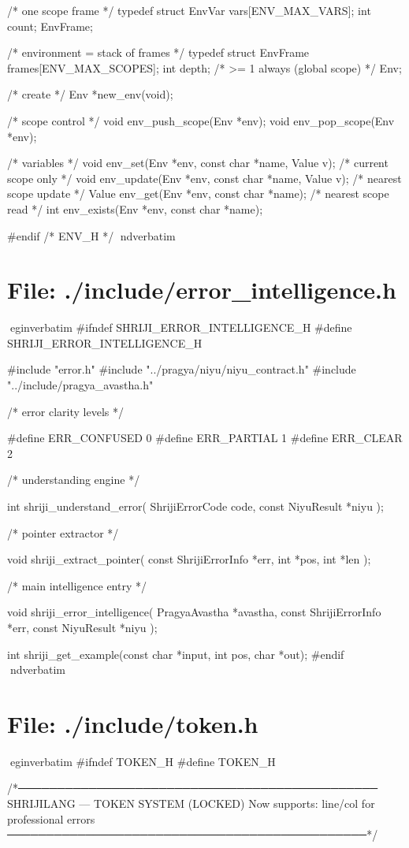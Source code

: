 \documentclass{article}
\begin{document}
/* one scope frame */
typedef struct {
    EnvVar vars[ENV_MAX_VARS];
    int count;
} EnvFrame;

/* environment = stack of frames */
typedef struct {
    EnvFrame frames[ENV_MAX_SCOPES];
    int depth; /* >= 1 always (global scope) */
} Env;

/* create */
Env *new_env(void);

/* scope control */
void env_push_scope(Env *env);
void env_pop_scope(Env *env);

/* variables */
void env_set(Env *env, const char *name, Value v);       /* current scope only */
void env_update(Env *env, const char *name, Value v);    /* nearest scope update */
Value env_get(Env *env, const char *name);               /* nearest scope read */
int env_exists(Env *env, const char *name);

#endif /* ENV_H */
nd{verbatim}
\section*{File: ./include/error_intelligence.h}
egin{verbatim}
#ifndef SHRIJI_ERROR_INTELLIGENCE_H
#define SHRIJI_ERROR_INTELLIGENCE_H

#include "error.h"
#include "../pragya/niyu/niyu_contract.h"
#include "../include/pragya_avastha.h"

/* error clarity levels */

#define ERR_CONFUSED 0
#define ERR_PARTIAL  1
#define ERR_CLEAR    2


/* understanding engine */

int shriji_understand_error(
    ShrijiErrorCode code,
    const NiyuResult *niyu
);


/* pointer extractor */

void shriji_extract_pointer(
    const ShrijiErrorInfo *err,
    int *pos,
    int *len
);


/* main intelligence entry */

void shriji_error_intelligence(
    PragyaAvastha *avastha,
    const ShrijiErrorInfo *err,
    const NiyuResult *niyu
);

int shriji_get_example(const char *input, int pos, char *out);
#endif
nd{verbatim}
\section*{File: ./include/token.h}
egin{verbatim}
#ifndef TOKEN_H
#define TOKEN_H

/*──────────────────────────────────────────────
  SHRIJILANG — TOKEN SYSTEM (LOCKED)
  Now supports: line/col for professional errors
──────────────────────────────────────────────*/
\end{document}
